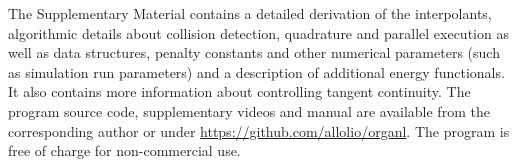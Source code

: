 \documentclass[twocolumn]{biophys-new}
\begin{document}
The Supplementary Material contains a detailed derivation of the interpolants, algorithmic details about collision detection, quadrature and parallel execution as well as data structures, penalty constants and other numerical parameters (such as simulation run parameters) and a description of additional energy functionals. It also contains more information about controlling tangent continuity. The program source code, supplementary videos and manual are available from the corresponding author or under \url{https://github.com/allolio/organl}. The program is free of charge for non-commercial use.
\end{document}

